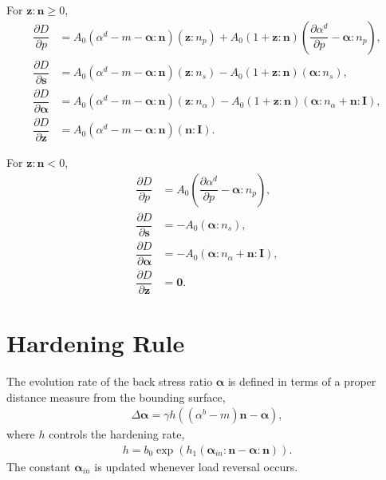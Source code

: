 \documentclass[11pt,a4paper]{article}
\newcommand*{\pfrac}[2]{\dfrac{\partial#1}{\partial#2}}
\begin{document}
For $\mathbold{z}:\mathbold{n}\geqslant0$,
\begin{align}
\pfrac{D}{p}&=A_0\left(\alpha^d-m-\mathbold{\alpha}:\mathbold{n}\right)\left(\mathbold{z}:n_p\right)+A_0\left(1+\mathbold{z}:\mathbold{n}\right)\left(\pfrac{\alpha^d}{p}-\mathbold{\alpha}:n_p\right),\\
\pfrac{D}{\mathbold{s}}&=A_0\left(\alpha^d-m-\mathbold{\alpha}:\mathbold{n}\right)\left(\mathbold{z}:n_s\right)-A_0\left(1+\mathbold{z}:\mathbold{n}\right)\left(\mathbold{\alpha}:n_s\right),\\
\pfrac{D}{\mathbold{\alpha}}&=A_0\left(\alpha^d-m-\mathbold{\alpha}:\mathbold{n}\right)\left(\mathbold{z}:n_\alpha\right)-A_0\left(1+\mathbold{z}:\mathbold{n}\right)\left(\mathbold{\alpha}:n_\alpha+\mathbold{n}:\mathbf{I}\right),\\
\pfrac{D}{\mathbold{z}}&=A_0\left(\alpha^d-m-\mathbold{\alpha}:\mathbold{n}\right)\left(\mathbold{n}:\mathbf{I}\right).
\end{align}

For $\mathbold{z}:\mathbold{n}<0$,
\begin{align}
\pfrac{D}{p}&=A_0\left(\pfrac{\alpha^d}{p}-\mathbold{\alpha}:n_p\right),\\
\pfrac{D}{\mathbold{s}}&=-A_0\left(\mathbold{\alpha}:n_s\right),\\
\pfrac{D}{\mathbold{\alpha}}&=-A_0\left(\mathbold{\alpha}:n_\alpha+\mathbold{n}:\mathbf{I}\right),\\
\pfrac{D}{\mathbold{z}}&=\mathbold{0}.
\end{align}
\section{Hardening Rule}
The evolution rate of the back stress ratio $\mathbold{\alpha}$ is defined in terms of a proper distance measure from the bounding surface,
\begin{gather}
\Delta\mathbold{\alpha}=\gamma{}h\left(\left(\alpha^b-m\right)\mathbold{n}-\mathbold{\alpha}\right),
\end{gather}
where $h$ controls the hardening rate,
\begin{gather}
h=b_0\exp\left(h_1\left(\mathbold{\alpha}_{in}:\mathbold{n}-\mathbold{\alpha}:\mathbold{n}\right)\right).
\end{gather}
The constant $\mathbold{\alpha}_{in}$ is updated whenever load reversal occurs.
\end{document}
